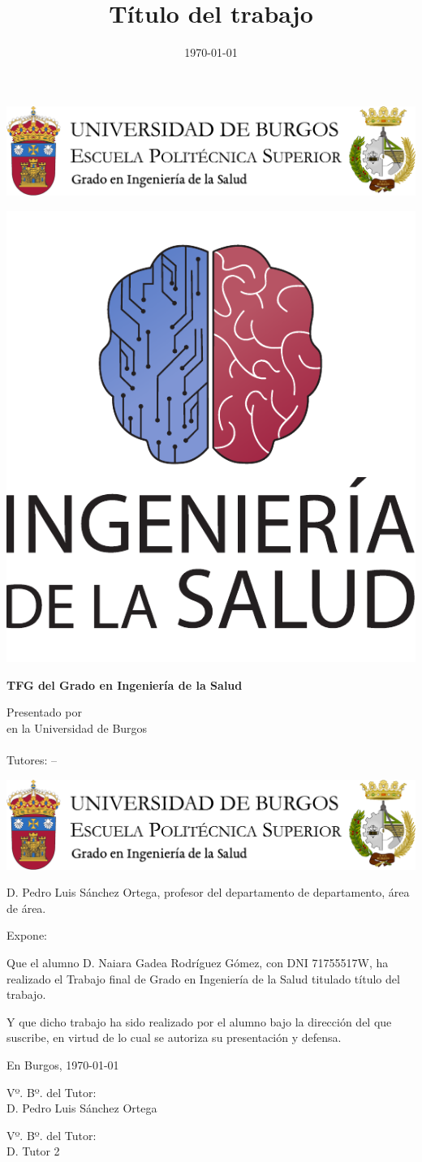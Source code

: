 \documentclass[a4paper,12pt,twoside]{memoir}
\title{Título del trabajo}
\author{\nombre}
\date{\today}
\makeatletter
\def\maketitle{
  \null
  \thispagestyle{empty}
\begin{center}
  \noindent\includegraphics[width=\textwidth]{cabeceraSalud}\vspace{1.5cm}%
\end{center}
  
  \begin{center}
    \begin{minipage}[c][1.5cm][c]{.20\textwidth}
        \includegraphics[width=\textwidth]{escudoSalud.pdf}
    \end{minipage}
  \end{center}
  
  \begin{center}
    \colorbox{cpardoBox}{%
        \begin{minipage}{.8\textwidth}
          \vspace{.5cm}\Large
          \begin{center}
          \textbf{TFG del Grado en Ingeniería de la Salud}\vspace{.6cm}\\
          \textbf{\LARGE\@title{}}
          \end{center}
          \vspace{.2cm}
        \end{minipage}
    }%
  \end{center}
  
  \begin{center}%
  {%
    \noindent\LARGE
    Presentado por \@author{}\\ 
    en la Universidad de Burgos\\
    \vspace{0.5cm}
    \noindent\Large
    \@date{}\\
    \vspace{0.5cm}
    Tutores: \@tutor{} -- \@tutorb{}\\
  }%
  \end{center}%
  \null
  \cleardoublepage
  }
\newcommand{\nombre}{Naiara Gadea Rodríguez Gómez}
\newcommand{\nombreTutor}{Pedro Luis Sánchez Ortega}
\newcommand{\nombreTutorb}{Tutor 2}
\newcommand{\dni}{71755517W}
\makeatother
\begin{document}
\maketitle


\newpage\null\thispagestyle{empty}\newpage

\thispagestyle{empty}


\noindent\includegraphics[width=\textwidth]{cabeceraSalud}\vspace{1cm}

\noindent D. \nombreTutor, profesor del departamento de departamento, área de área.

\noindent Expone:

\noindent Que el alumno D. \nombre, con DNI \dni, ha realizado el Trabajo final de Grado en Ingeniería de la Salud titulado título del trabajo. 

\noindent Y que dicho trabajo ha sido realizado por el alumno bajo la dirección del que suscribe, en virtud de lo cual se autoriza su presentación y defensa.

\begin{center} %
En Burgos, {\large \today}
\end{center}

\vfill\vfill\vfill

\begin{minipage}{0.45\textwidth}
\begin{flushleft} %
Vº. Bº. del Tutor:\\[2cm]
D. \nombreTutor
\end{flushleft}
\end{minipage}
\hfill
\begin{minipage}{0.45\textwidth}
\begin{flushleft} %
Vº. Bº. del Tutor:\\[2cm]
D. \nombreTutorb
\end{flushleft}
\end{minipage}
\hfill

\vfill

\end{document}
